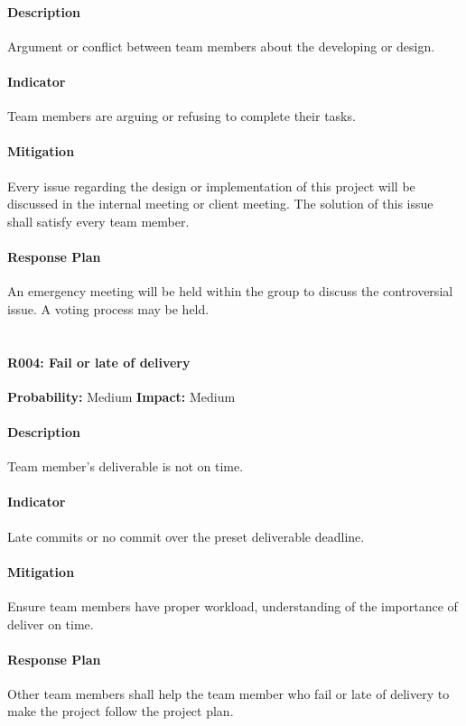 \documentclass[11pt, a4paper]{report}
\begin{document}
	\paragraph{Description}Argument or conflict between team members about the developing or design. 
	\paragraph{Indicator}Team members are arguing or refusing to complete their tasks.
	\paragraph{Mitigation}Every issue regarding the design or implementation of this project will be discussed in the internal meeting or client meeting. The solution of this issue shall satisfy every team member.
	\paragraph{Response Plan}An emergency meeting will be held within the group to discuss the controversial issue. A voting process may be held.\\\\

	\paragraph{R004: Fail or late of delivery} \hspace{1cm} \textbf{Probability: }Medium\hspace{1cm}   \textbf{Impact: }Medium
	\paragraph{Description}Team member's deliverable is not on time.
	\paragraph{Indicator}Late commits or no commit over the preset deliverable deadline.
	\paragraph{Mitigation}Ensure team members have proper workload, understanding of the importance of deliver on time. 
	\paragraph{Response Plan}Other team members shall help the team member who fail or late of delivery to make the project follow the project plan. \\\\
\end{document}
